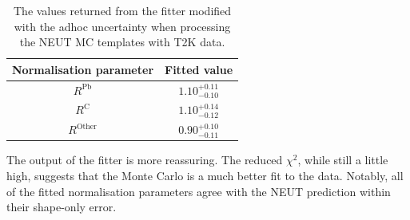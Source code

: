 \begin{table}
  \begin{tabular}{c c }
    Normalisation parameter & Fitted value \\ \hline \hline
    $R^{\textrm{Pb}}$ & $1.10^{+0.11}_{-0.10}$  \\
    $R^{\textrm{C}}$ & $1.10^{+0.14}_{-0.12}$  \\
    $R^{\textrm{Other}}$ & $0.90^{+0.10}_{-0.11}$  \\
  \end{tabular}
  \caption{The values returned from the fitter modified with the adhoc uncertainty  when processing the NEUT MC templates with T2K data.}
  \label{table:NEUTMCTemplatesT2KDataFitParametersWithFudge}
\end{table}
The output of the fitter is more reassuring.  The reduced $\chi^2$, while still a little high, suggests that the Monte Carlo is a much better fit to the data.  Notably, all of the fitted normalisation parameters agree with the NEUT prediction within their shape-only error.

